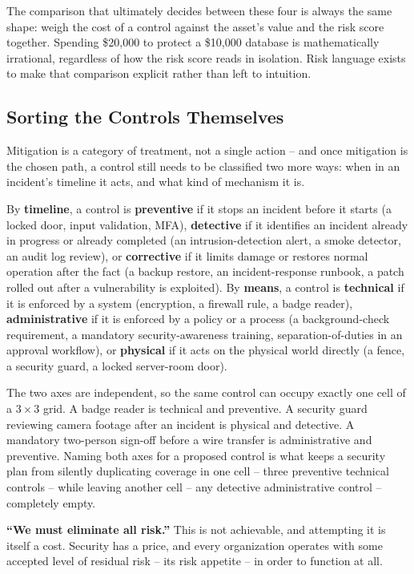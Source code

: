 The comparison that ultimately decides between these four is always the same shape: weigh the
cost of a control against the asset's value and the risk score together. Spending \$20{,}000 to
protect a \$10{,}000 database is mathematically irrational, regardless of how the risk score reads
in isolation. Risk language exists to make that comparison explicit rather than left to
intuition.

\subsection{Sorting the Controls Themselves}

Mitigation is a category of treatment, not a single action -- and once mitigation is the chosen
path, a control still needs to be classified two more ways: when in an incident's timeline it
acts, and what kind of mechanism it is.

By \textbf{timeline}, a control is \textbf{preventive} if it stops an incident before it starts (a
locked door, input validation, MFA), \textbf{detective} if it identifies an incident already in
progress or already completed (an intrusion-detection alert, a smoke detector, an audit log
review), or \textbf{corrective} if it limits damage or restores normal operation after the fact (a
backup restore, an incident-response runbook, a patch rolled out after a vulnerability is
exploited). By \textbf{means}, a control is \textbf{technical} if it is enforced by a system
(encryption, a firewall rule, a badge reader), \textbf{administrative} if it is enforced by a
policy or a process (a background-check requirement, a mandatory security-awareness training,
separation-of-duties in an approval workflow), or \textbf{physical} if it acts on the physical
world directly (a fence, a security guard, a locked server-room door).

The two axes are independent, so the same control can occupy exactly one cell of a $3\times3$
grid. A badge reader is technical and preventive. A security guard reviewing camera footage after
an incident is physical and detective. A mandatory two-person sign-off before a wire transfer is
administrative and preventive. Naming both axes for a proposed control is what keeps a security
plan from silently duplicating coverage in one cell -- three preventive technical controls -- while
leaving another cell -- any detective administrative control -- completely empty.

\begin{misconception}
\textbf{``We must eliminate all risk.''} This is not achievable, and attempting it is itself a
cost. Security has a price, and every organization operates with some accepted level of residual
risk -- its risk appetite -- in order to function at all.
\end{misconception}

